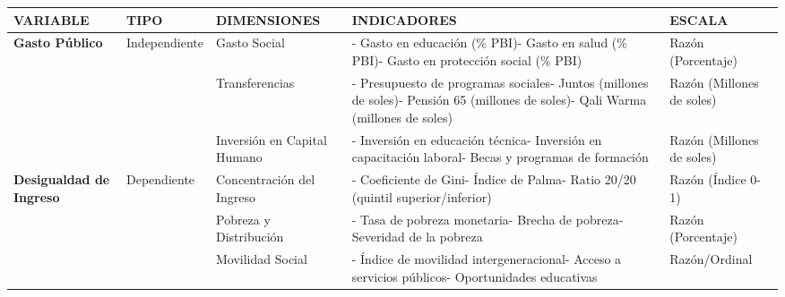 \documentclass[
  man,
  floatsintext,
  longtable,
  a4paper,
  nolmodern,
  notxfonts,
  notimes,
  12pt,
  colorlinks=true,linkcolor=blue,citecolor=blue,urlcolor=blue]{apa7}
\newcounter{none} %
\begin{document}
{\def\LTcaptype{none} %
\begin{longtable}[]{@{}
  >{\raggedright\arraybackslash}p{}
  >{\raggedright\arraybackslash}p{}
  >{\raggedright\arraybackslash}p{}
  >{\raggedright\arraybackslash}p{}
  >{\raggedright\arraybackslash}p{}@{}}
\toprule\noalign{}
\begin{minipage}[b]{\linewidth}\raggedright
VARIABLE
\end{minipage} & \begin{minipage}[b]{\linewidth}\raggedright
TIPO
\end{minipage} & \begin{minipage}[b]{\linewidth}\raggedright
DIMENSIONES
\end{minipage} & \begin{minipage}[b]{\linewidth}\raggedright
INDICADORES
\end{minipage} & \begin{minipage}[b]{\linewidth}\raggedright
ESCALA
\end{minipage} \\
\midrule\noalign{}
\endhead
\bottomrule\noalign{}
\endlastfoot
\textbf{Gasto Público} & Independiente & Gasto Social & - Gasto en
educación (\% PBI)- Gasto en salud (\% PBI)- Gasto en protección social
(\% PBI) & Razón (Porcentaje) \\
& & Transferencias & - Presupuesto de programas sociales- Juntos
(millones de soles)- Pensión 65 (millones de soles)- Qali Warma
(millones de soles) & Razón (Millones de soles) \\
& & Inversión en Capital Humano & - Inversión en educación técnica-
Inversión en capacitación laboral- Becas y programas de formación &
Razón (Millones de soles) \\
\textbf{Desigualdad de Ingreso} & Dependiente & Concentración del
Ingreso & - Coeficiente de Gini- Índice de Palma- Ratio 20/20 (quintil
superior/inferior) & Razón (Índice 0-1) \\
& & Pobreza y Distribución & - Tasa de pobreza monetaria- Brecha de
pobreza- Severidad de la pobreza & Razón (Porcentaje) \\
& & Movilidad Social & - Índice de movilidad intergeneracional- Acceso a
servicios públicos- Oportunidades educativas & Razón/Ordinal \\
\end{longtable}
}
\end{document}
